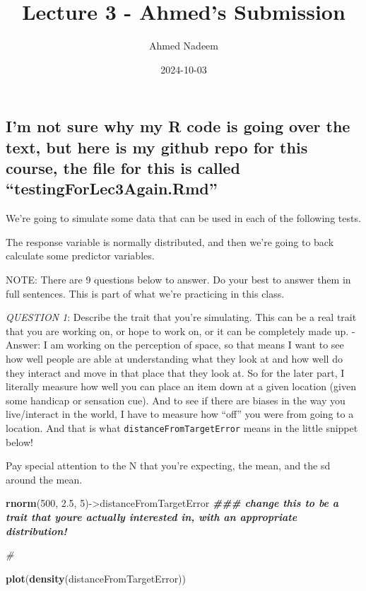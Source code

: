 \documentclass[
]{article}
\title{Lecture 3 - Ahmed's Submission}
\author{Ahmed Nadeem}
\date{2024-10-03}
\newenvironment{Shaded}{\begin{snugshade}}{\end{snugshade}}
\newcommand{\CommentTok}[1]{\textcolor[rgb]{0.56,0.35,0.01}{\textit{#1}}}
\newcommand{\DecValTok}[1]{\textcolor[rgb]{0.00,0.00,0.81}{#1}}
\newcommand{\DocumentationTok}[1]{\textcolor[rgb]{0.56,0.35,0.01}{\textbf{\textit{#1}}}}
\newcommand{\FloatTok}[1]{\textcolor[rgb]{0.00,0.00,0.81}{#1}}
\newcommand{\FunctionTok}[1]{\textcolor[rgb]{0.13,0.29,0.53}{\textbf{#1}}}
\newcommand{\NormalTok}[1]{#1}
\newcommand{\OtherTok}[1]{\textcolor[rgb]{0.56,0.35,0.01}{#1}}
\begin{document}
\maketitle

\hypertarget{im-not-sure-why-my-r-code-is-going-over-the-text-but-here-is-my-github-repo-for-this-course-the-file-for-this-is-called-testingforlec3again.rmd}{%
\subsection{I'm not sure why my R code is going over the text, but here
is my github repo for this course, the file for this is called
``testingForLec3Again.Rmd''}\label{im-not-sure-why-my-r-code-is-going-over-the-text-but-here-is-my-github-repo-for-this-course-the-file-for-this-is-called-testingforlec3again.rmd}}

We're going to simulate some data that can be used in each of the
following tests.

The response variable is normally distributed, and then we're going to
back calculate some predictor variables.

NOTE: There are 9 questions below to answer. Do your best to answer them
in full sentences. This is part of what we're practicing in this class.

\emph{QUESTION 1}: Describe the trait that you're simulating. This can
be a real trait that you are working on, or hope to work on, or it can
be completely made up. - Answer: I am working on the perception of
space, so that means I want to see how well people are able at
understanding what they look at and how well do they interact and move
in that place that they look at. So for the later part, I literally
measure how well you can place an item down at a given location (given
some handicap or sensation cue). And to see if there are biases in the
way you live/interact in the world, I have to measure how ``off'' you
were from going to a location. And that is what
\texttt{distanceFromTargetError} means in the little snippet below!

Pay special attention to the N that you're expecting, the mean, and the
sd around the mean.

\begin{Shaded}
\begin{Highlighting}[]
\FunctionTok{rnorm}\NormalTok{(}\DecValTok{500}\NormalTok{, }\FloatTok{2.5}\NormalTok{, }\DecValTok{5}\NormalTok{)}\OtherTok{{-}\textgreater{}}\NormalTok{distanceFromTargetError }\DocumentationTok{\#\#\# change this to be a trait that you\textquotesingle{}re actually interested in, with an appropriate distribution! }

\CommentTok{\# }

\FunctionTok{plot}\NormalTok{(}\FunctionTok{density}\NormalTok{(distanceFromTargetError))}
\end{Highlighting}
\end{Shaded}
\end{document}
